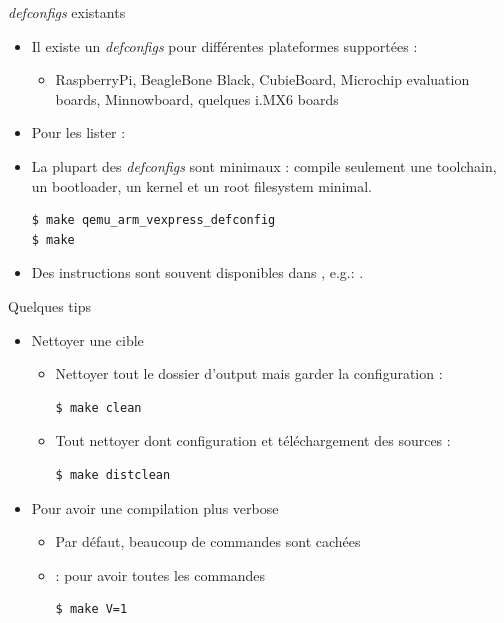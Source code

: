 \documentclass[aspectratio=169,obeyspaces,spaces,hyphens,dvipsnames]{beamer}
\begin{document}
\begin{frame}[fragile]{{\em defconfigs} existants}
  \begin{itemize}
  \item  Il existe un {\em defconfigs} pour différentes plateformes supportées :
    \begin{itemize}
    \item RaspberryPi, BeagleBone Black, CubieBoard, Microchip evaluation
      boards, Minnowboard, quelques i.MX6 boards
    \end{itemize}
  \item Pour les lister : 
  \item La plupart des {\em defconfigs} sont minimaux : compile seulement une
    toolchain, un bootloader, un kernel et un root filesystem minimal.
    \begin{block}{}
\begin{verbatim}
$ make qemu_arm_vexpress_defconfig
$ make
\end{verbatim}
    \end{block}
  \item Des instructions sont souvent disponibles dans
    , e.g.: .
  \end{itemize}
\end{frame}

\begin{frame}[fragile]{Quelques tips}
  \begin{itemize}
  \item Nettoyer une cible
    \begin{itemize}
    \item Nettoyer tout le dossier d'output mais garder la configuration :
      \begin{block}{}
\begin{verbatim}
$ make clean
\end{verbatim}
      \end{block}
    \item Tout nettoyer dont configuration et téléchargement des sources :
      \begin{block}{}
\begin{verbatim}
$ make distclean
\end{verbatim}
      \end{block}
    \end{itemize}
  \item Pour avoir une compilation plus verbose
    \begin{itemize}
    \item Par défaut, beaucoup de commandes sont cachées
    \item {} : pour avoir toutes les commandes
      \begin{block}{}
\begin{verbatim}
$ make V=1
\end{verbatim}
      \end{block}
    \end{itemize}
  \end{itemize}
\end{frame}
\end{document}
